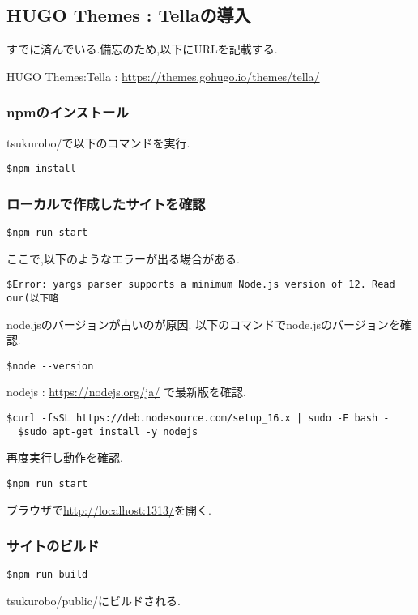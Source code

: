 \subsection{HUGO Themes : Tellaの導入}
すでに済んでいる.備忘のため,以下にURLを記載する.

HUGO Themes:Tella : \url{https://themes.gohugo.io/themes/tella/}

\subsubsection{npmのインストール}

tsukurobo/で以下のコマンドを実行.
\begin{lstlisting}[]
  $npm install
\end{lstlisting}

\subsubsection{ローカルで作成したサイトを確認}

\begin{lstlisting}[]
  $npm run start
\end{lstlisting}

ここで,以下のようなエラーが出る場合がある.

\begin{lstlisting}[]
  $Error: yargs parser supports a minimum Node.js version of 12. Read our(以下略
\end{lstlisting}

node.jsのバージョンが古いのが原因.
以下のコマンドでnode.jsのバージョンを確認.

\begin{lstlisting}[]
  $node --version
\end{lstlisting}

nodejs : \url{https://nodejs.org/ja/}
で最新版を確認.

\begin{lstlisting}[]
  $curl -fsSL https://deb.nodesource.com/setup_16.x | sudo -E bash -
  $sudo apt-get install -y nodejs
\end{lstlisting}

再度実行し動作を確認.

\begin{lstlisting}[]
  $npm run start
\end{lstlisting}

ブラウザで\url{http://localhost:1313/}を開く.

\subsubsection{サイトのビルド}

\begin{lstlisting}[]
  $npm run build
\end{lstlisting}

tsukurobo/public/にビルドされる.